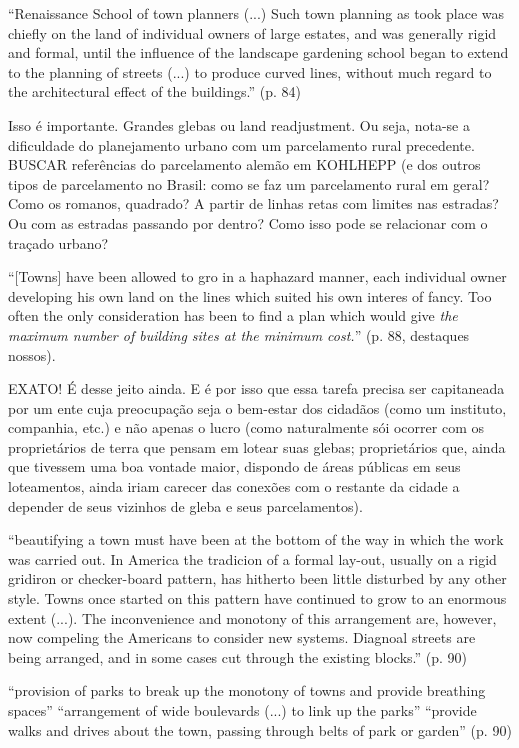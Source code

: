 \documentclass[12pt, a4paper]{book} %
\begin{document}
        ``Renaissance School of town planners (...) Such town planning as took place was chiefly on the land of individual owners of large estates, and was generally rigid and formal, until the influence of the landscape gardening school began to extend to the planning of streets (...) to produce curved lines, without much regard to the architectural effect of the buildings.'' (p. 84)

        Isso é importante.  Grandes glebas ou land readjustment. Ou seja, nota-se a dificuldade do planejamento urbano com um parcelamento rural precedente.  BUSCAR referências do parcelamento alemão em KOHLHEPP (e dos outros tipos de parcelamento no Brasil: como se faz um parcelamento rural em geral? Como os romanos, quadrado? A partir de linhas retas com limites nas estradas? Ou com as estradas passando por dentro? Como isso pode se relacionar com o traçado urbano?

        ``[Towns] have been allowed to gro in a haphazard manner, each individual owner developing his own land on the lines which suited his own interes of fancy. Too often the only consideration has been to find a plan which would give \textit{the maximum number of building sites at the minimum cost.}'' (p. 88, destaques nossos).

        EXATO! É desse jeito ainda. E é por isso que essa tarefa precisa ser capitaneada por um ente cuja preocupação seja o bem-estar dos cidadãos (como um instituto, companhia, etc.) e não apenas o lucro (como naturalmente sói ocorrer com os proprietários de terra que pensam em lotear suas glebas; proprietários que, ainda que tivessem uma boa vontade maior, dispondo de áreas públicas em seus loteamentos, ainda iriam carecer das conexões com o restante da cidade a depender de seus vizinhos de gleba e seus parcelamentos).

        ``beautifying a town must have been at the bottom of the way in which the work was carried out. In America the tradicion of a formal lay-out, usually on a rigid gridiron or checker-board pattern, has hitherto been little disturbed by any other style. Towns once started on this pattern have continued to grow to an enormous extent (...). The inconvenience and monotony of this arrangement are, however, now compeling the Americans to consider new systems. Diagnoal streets are being arranged, and in some cases cut through the existing blocks.'' (p. 90) %

        ``provision of parks to break up the monotony of towns and provide breathing spaces''
        ``arrangement of wide boulevards (...) to link up the parks''
        ``provide walks and drives about the town, passing through belts of park or garden'' (p. 90)
\end{document}

